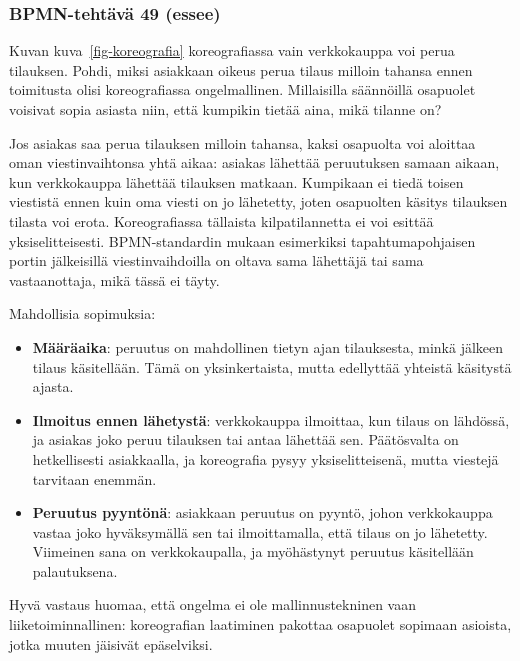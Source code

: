 \documentclass[
  finnish,
  letterpaper,
  DIV=11,
  numbers=noendperiod,
  oneside]{scrreprt}
\providecommand{\tightlist}{%
  \setlength{\itemsep}{0pt}\setlength{\parskip}{0pt}}
\begin{document}
\subsubsection{BPMN-tehtävä 49
(essee)}\label{bpmn-tehtuxe4vuxe4-49-essee}

Kuvan kuva~\ref{fig-koreografia} koreografiassa vain verkkokauppa voi
perua tilauksen. Pohdi, miksi asiakkaan oikeus perua tilaus milloin
tahansa ennen toimitusta olisi koreografiassa ongelmallinen. Millaisilla
säännöillä osapuolet voisivat sopia asiasta niin, että kumpikin tietää
aina, mikä tilanne on?

\begin{tcolorbox}[enhanced jigsaw, arc=.35mm, bottomrule=.15mm, bottomtitle=1mm, breakable, colback=white, colbacktitle=quarto-callout-tip-color!10!white, colframe=quarto-callout-tip-color-frame, coltitle=black, left=2mm, leftrule=.75mm, opacityback=0, opacitybacktitle=0.6, rightrule=.15mm, title=\textcolor{quarto-callout-tip-color}{\faLightbulb}\hspace{0.5em}{Malliratkaisu}, titlerule=0mm, toprule=.15mm, toptitle=1mm]

Jos asiakas saa perua tilauksen milloin tahansa, kaksi osapuolta voi
aloittaa oman viestinvaihtonsa yhtä aikaa: asiakas lähettää peruutuksen
samaan aikaan, kun verkkokauppa lähettää tilauksen matkaan. Kumpikaan ei
tiedä toisen viestistä ennen kuin oma viesti on jo lähetetty, joten
osapuolten käsitys tilauksen tilasta voi erota. Koreografiassa tällaista
kilpatilannetta ei voi esittää yksiselitteisesti. BPMN-standardin mukaan
esimerkiksi tapahtumapohjaisen portin jälkeisillä viestinvaihdoilla on
oltava sama lähettäjä tai sama vastaanottaja, mikä tässä ei täyty.

Mahdollisia sopimuksia:

\begin{itemize}
\tightlist
\item
  \textbf{Määräaika}: peruutus on mahdollinen tietyn ajan tilauksesta,
  minkä jälkeen tilaus käsitellään. Tämä on yksinkertaista, mutta
  edellyttää yhteistä käsitystä ajasta.
\item
  \textbf{Ilmoitus ennen lähetystä}: verkkokauppa ilmoittaa, kun tilaus
  on lähdössä, ja asiakas joko peruu tilauksen tai antaa lähettää sen.
  Päätösvalta on hetkellisesti asiakkaalla, ja koreografia pysyy
  yksiselitteisenä, mutta viestejä tarvitaan enemmän.
\item
  \textbf{Peruutus pyyntönä}: asiakkaan peruutus on pyyntö, johon
  verkkokauppa vastaa joko hyväksymällä sen tai ilmoittamalla, että
  tilaus on jo lähetetty. Viimeinen sana on verkkokaupalla, ja
  myöhästynyt peruutus käsitellään palautuksena.
\end{itemize}

Hyvä vastaus huomaa, että ongelma ei ole mallinnustekninen vaan
liiketoiminnallinen: koreografian laatiminen pakottaa osapuolet sopimaan
asioista, jotka muuten jäisivät epäselviksi.

\end{tcolorbox}
\end{document}
